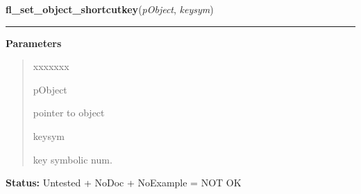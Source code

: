 \hspace{.8\funcindent}\begin{boxedminipage}{\funcwidth}

    \raggedright \textbf{fl\_set\_object\_shortcutkey}(\textit{pObject}, \textit{keysym})

    \vspace{-1.5ex}

    \rule{\textwidth}{0.5\fboxrule}
\setlength{\parskip}{2ex}
\setlength{\parskip}{1ex}
      \textbf{Parameters}
      \vspace{-1ex}

      \begin{quote}
        \begin{Ventry}{xxxxxxx}

          \item[pObject]

          pointer to object

          \item[keysym]

          key symbolic num.

        \end{Ventry}

      \end{quote}

\textbf{Status:} Untested + NoDoc + NoExample = NOT OK



    \end{boxedminipage}

    \label{xformslib:library:fl_set_object_dblbuffer}

    \vspace{0.5ex}

